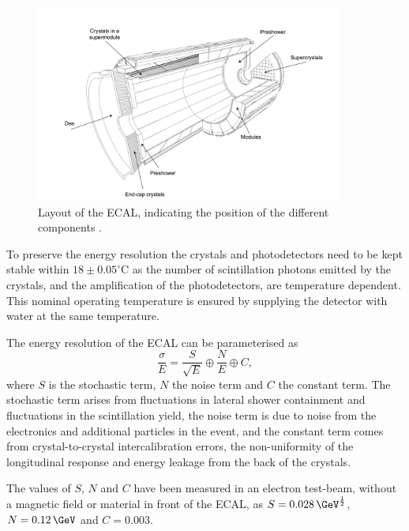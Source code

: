 \begin{figure}[h!]
\begin{center}
\includegraphics[width=0.9\textwidth]{./Detector/Plots/ECAL.png}
\caption[Layout of the ECAL, indicating the positions
of the different components.]{Layout of the \ac{ECAL}, indicating the position of the
different components \cite{cms-jinst}.}
\label{fig:CMS_ECAL}
\end{center}
\end{figure}

To preserve the energy resolution the crystals and
photodetectors need to be kept stable within $18\pm 0.05^{\circ}$C
as the number of scintillation photons emitted by the crystals,
and the amplification of the photodetectors, are temperature dependent.
This nominal operating temperature is ensured by 
supplying the detector with water at the same temperature.

The energy resolution of the \ac{ECAL} can be parameterised as
\begin{equation}\label{eqn:ecalres}
\frac{\sigma}{E} = \frac{S}{\sqrt{E}}\oplus\frac{N}{E}\oplus C,
\end{equation}
where $S$ is the stochastic term, $N$ the noise term and $C$ the constant term.
The stochastic term arises from fluctuations in lateral shower containment and 
fluctuations in the scintillation yield, the noise term is due to noise from the electronics
and additional particles in the event, and the constant term comes
from crystal-to-crystal intercalibration errors, the non-uniformity of the longitudinal response and 
energy leakage from the back of the crystals.

The values of $S$, $N$ and $C$ have been measured in an electron
test-beam, without a magnetic field or material in front of the \ac{ECAL}, as 
$S = 0.028\,\GeV^{\frac{1}{2}}$, $N = 0.12\,\GeV$ and $C= 0.003$.

